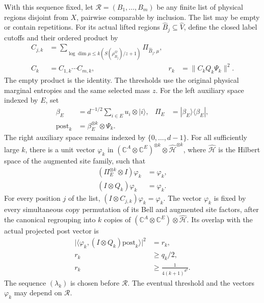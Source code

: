 \begin{theorem}
With this sequence fixed, let $\mathcal R=(B_1,\ldots,B_m)$ be any
finite list of physical regions disjoint from $X$, pairwise comparable
by inclusion. The list may be empty or contain repetitions. For its
actual lifted regions $\widehat B_j\subseteq\widehat V$, define the
closed label cutoffs and their ordered product by
\begin{align}
 C_{j,k}&=\sum_{\log\dim\mu\le k(S(\rho_{B_j}^\Omega)/z+1)}
                  \Pi_{\widehat B_j,\mu},\\
 C_k&=C_{1,k}\cdots C_{m,k},
 &r_k&=\|C_kQ_k\Psi_k\|^2.
\end{align}
The empty product is the identity. The thresholds use the original
physical marginal entropies and the same selected mass $z$.
For the left auxiliary space indexed by $E$, set
\begin{align}
 \beta_E&=d^{-1/2}\sum_{i\in E}u_i\otimes|i\rangle,
 &\Pi_E&=|\beta_E\rangle\langle\beta_E|,\\
 \mathrm{post}_k&=\beta_E^{\otimes k}\otimes\Psi_k.
\end{align}
The right auxiliary space remains indexed by $\{0,\ldots,d-1\}$.
For all sufficiently large $k$, there is a unit vector $\varphi_k$ in
$(\mathbb C^A\otimes\mathbb C^E)^{\otimes k}\otimes
\widehat{\mathcal H}^{\otimes k}$, where $\widehat{\mathcal H}$ is the
Hilbert space of the augmented site family, such that
\begin{align}
 (\Pi_E^{\otimes k}\otimes I)\varphi_k&=\varphi_k,\\
 (I\otimes Q_k)\varphi_k&=\varphi_k.
\end{align}
For every position $j$ of the list,
$(I\otimes C_{j,k})\varphi_k=\varphi_k$. The vector $\varphi_k$ is
fixed by every simultaneous copy permutation of its Bell and augmented
site factors, after the canonical regrouping into $k$ copies of
$(\mathbb C^A\otimes\mathbb C^E)\otimes\widehat{\mathcal H}$.
Its overlap with the actual projected post vector is
\begin{align}
 \bigl|\langle\varphi_k,(I\otimes Q_k)\mathrm{post}_k\rangle\bigr|^2
   &=r_k,\\
 r_k&\ge q_k/2,\\
 r_k&\ge\frac1{4(k+1)^{d^2}}.
\end{align}
The sequence $(\lambda_k)$ is chosen before $\mathcal R$. The eventual
threshold and the vectors $\varphi_k$ may depend on $\mathcal R$.
\end{theorem}

